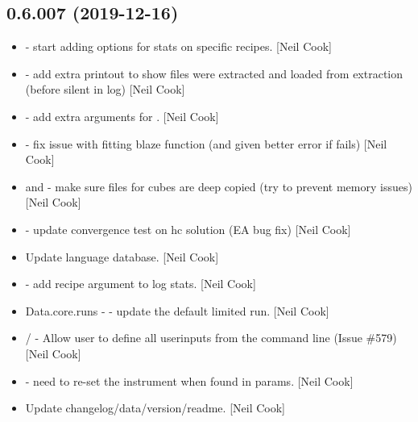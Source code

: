 \documentclass[a4paper,10pt,english]{report}
\begin{document}
\subsection{0.6.007 (2019-12-16)}
\label{\detokenize{misc/changelog:id11}}\begin{itemize}
\item {} 
 - start adding options for stats on
specific recipes. {[}Neil Cook{]}

\item {} 
 - add extra printout to show files were
extracted and loaded from extraction (before silent in log) {[}Neil
Cook{]}

\item {} 
 - add extra arguments for
. {[}Neil Cook{]}

\item {} 
 - fix issue with fitting blaze function
(and given better error if  fails) {[}Neil Cook{]}

\item {} 
 and  - make sure files for
cubes are deep copied (try to prevent memory issues) {[}Neil Cook{]}

\item {} 
 - update convergence test on hc solution (EA bug
fix) {[}Neil Cook{]}

\item {} 
Update language database. {[}Neil Cook{]}

\item {} 
 - add recipe argument
to log stats. {[}Neil Cook{]}

\item {} 
Data.core.runs -  - update the default limited run.
{[}Neil Cook{]}

\item {} 
 /  - Allow user to define all userinputs
from the command line (Issue \#579) {[}Neil Cook{]}

\item {} 
 - need to re-set the instrument when found in params.
{[}Neil Cook{]}

\item {} 
Update changelog/data/version/readme. {[}Neil Cook{]}

\end{itemize}
\end{document}
